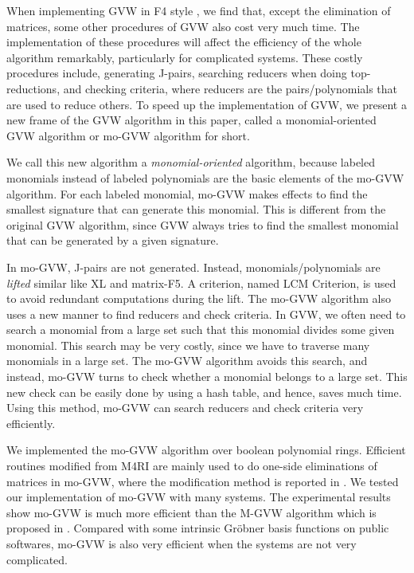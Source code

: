 \documentclass[final, number, 3p,12pt]{elsarticle}
\begin{document}
When implementing GVW in F4 style \citep{SunDW14}, we find that, except the elimination of  matrices, some other procedures of GVW also cost very much time. The implementation of these procedures will affect the efficiency of the whole algorithm remarkably, particularly for complicated systems. These costly procedures include, generating J-pairs, searching reducers when doing top-reductions, and checking criteria, where reducers are the pairs/polynomials that are used to reduce others. To speed up the implementation of GVW, we present a new frame of the GVW algorithm in this paper, called a monomial-oriented GVW algorithm or mo-GVW algorithm for short.


We call this new algorithm a {\em monomial-oriented} algorithm, because labeled monomials instead of labeled polynomials are the basic elements of the mo-GVW algorithm. For each labeled monomial, mo-GVW makes effects to find the smallest signature that can generate this monomial. This is different from the original GVW algorithm, since GVW always tries to find the smallest monomial that can be generated by a given signature. 

In mo-GVW, J-pairs are not generated. Instead, monomials/polynomials are {\em lifted} similar like XL and matrix-F5. A criterion, named LCM Criterion, is used to avoid redundant computations during the lift. The mo-GVW algorithm also uses a new manner to find reducers and check criteria. In GVW, we often need to search a monomial from a large set such that this monomial divides some given monomial. This search may be very costly, since we have to traverse many monomials in a large set. The mo-GVW algorithm avoids this search, and instead, mo-GVW turns to check whether a monomial belongs to a large set. This new check can be easily done by using a hash table, and hence, saves much time. Using this method, mo-GVW can search reducers and check criteria very efficiently.


We implemented the mo-GVW algorithm over boolean polynomial rings. Efficient routines modified from M4RI \citep{Albrecht13} are mainly used to do one-side eliminations of matrices in mo-GVW, where the modification method is reported in \citep{SunDW14}. We tested our implementation of mo-GVW with many systems. The experimental results show mo-GVW is much more efficient than the M-GVW algorithm which is proposed in \citep{SunDW14}. Compared with some intrinsic Gr\"obner basis functions on public softwares, mo-GVW is also very efficient when the systems are not very complicated.
\end{document}
